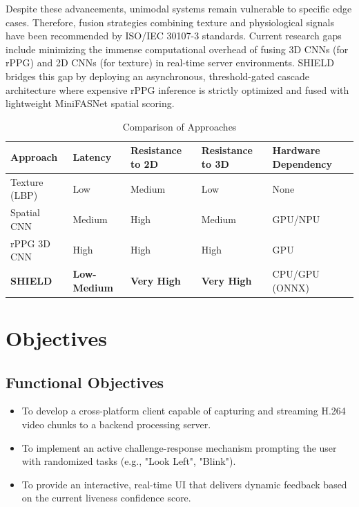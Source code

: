 \documentclass[12pt, a4paper]{report}
\begin{document}
Despite these advancements, unimodal systems remain vulnerable to specific edge cases. Therefore, fusion strategies combining texture and physiological signals have been recommended by ISO/IEC 30107-3 standards. Current research gaps include minimizing the immense computational overhead of fusing 3D CNNs (for rPPG) and 2D CNNs (for texture) in real-time server environments. SHIELD bridges this gap by deploying an asynchronous, threshold-gated cascade architecture where expensive rPPG inference is strictly optimized and fused with lightweight MiniFASNet spatial scoring.

\begin{table}[H]
\centering
\caption{Comparison of Approaches}
\begin{tabularx}{\textwidth}{|l|l|X|X|X|}
\hline
\textbf{Approach} & \textbf{Latency} & \textbf{Resistance to 2D} & \textbf{Resistance to 3D} & \textbf{Hardware Dependency} \\
\hline
Texture (LBP) & Low & Medium & Low & None \\
Spatial CNN & Medium & High & Medium & GPU/NPU \\
rPPG 3D CNN & High & High & High & GPU \\
\textbf{SHIELD} & \textbf{Low-Medium} & \textbf{Very High} & \textbf{Very High} & CPU/GPU (ONNX) \\
\hline
\end{tabularx}
\end{table}

\chapter{Objectives}

\section{Functional Objectives}
\begin{itemize}
    \item To develop a cross-platform client capable of capturing and streaming H.264 video chunks to a backend processing server.
    \item To implement an active challenge-response mechanism prompting the user with randomized tasks (e.g., "Look Left", "Blink").
    \item To provide an interactive, real-time UI that delivers dynamic feedback based on the current liveness confidence score.
\end{itemize}
\end{document}

